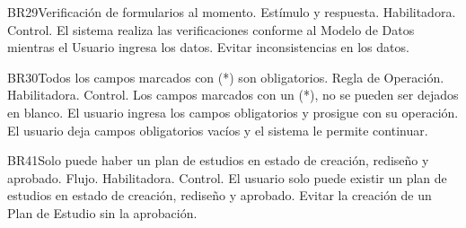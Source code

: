    \begin{BussinesRule}{BR29}{Verificación de formularios al momento.}
     \BRitem[Tipo:]  Estímulo y respuesta.
     \BRitem[Clase:] Habilitadora.
     \BRitem[Nivel:] Control.
     \BRitem[Descripción:] El sistema realiza las verificaciones conforme al Modelo de Datos mientras el Usuario ingresa los datos.
      Evitar inconsistencias en los datos.
  \end{BussinesRule}
\begin{BussinesRule}{BR30}{Todos los campos marcados con (*) son obligatorios.}
    \BRitem[Tipo:] Regla de Operación.
    \BRitem[Clase:] Habilitadora.
    \BRitem[Nivel:] Control.
    \BRitem[Descripción:] Los campos marcados con un (*), no se pueden ser dejados en blanco.
    \BRitem[Sentencia:]
     El usuario ingresa los campos obligatorios y prosigue con su operación.
    El usuario deja campos obligatorios vacíos y el sistema le permite continuar.
\end{BussinesRule}
\begin{BussinesRule}{BR41}{Solo puede haber un plan de estudios en estado de creación, rediseño y aprobado.}
    \BRitem[Tipo:] Flujo.
    \BRitem[Clase:] Habilitadora.
    \BRitem[Nivel:] Control.
    \BRitem[Descripción:] El usuario solo puede existir un plan de estudios en estado de creación, rediseño y aprobado.
     Evitar la creación de un Plan de Estudio sin la aprobación.
\end{BussinesRule}
\pagebreak